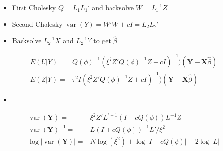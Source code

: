 \documentclass[12pt]{article}
\DeclareMathOperator{\var}{var}
\begin{document}
\begin{itemize}
\item First Cholesky  $Q = L_1 L_1'$ and backsolve $W = L_1^{-1}Z$
\item Second Cholesky $\var(Y) = W'W + c I = L_2 L_2'$
\item Backsolve $L_2^{-1}X$ and  $L_2^{-1}Y$ to get $\hat\beta$
\end{itemize}

\begin{align*}
E(U|Y) = &  Q(\phi)^{-1}
(\xi^2 Z' Q(\phi)^{-1}Z + c I)^{-1})
(\mathbf{Y} - \mathbf{X}\hat\beta)\\
E(Z|Y) = & \tau^2 I(\xi^2 Z' Q(\phi)^{-1}Z + c I)^{-1})
(\mathbf{Y} - \mathbf{X}\hat\beta)
\end{align*}

\begin{itemize}
  \item
\end{itemize}
\begin{align*}
\var(\mathbf{Y}) = &  \xi^2  Z ' L^{\prime -1}(  I + c  Q(\phi)  ) L^{-1} Z\\
\var(\mathbf{Y})^{-1} = &    L(  I + c  Q(\phi)  )^{-1} L' / \xi^2\\
\log |\var(\mathbf{Y})| = & N \log(\xi^2) + \log |I + c Q(\phi)| -
2 \log |L|\\
\end{align*}
\end{document}
